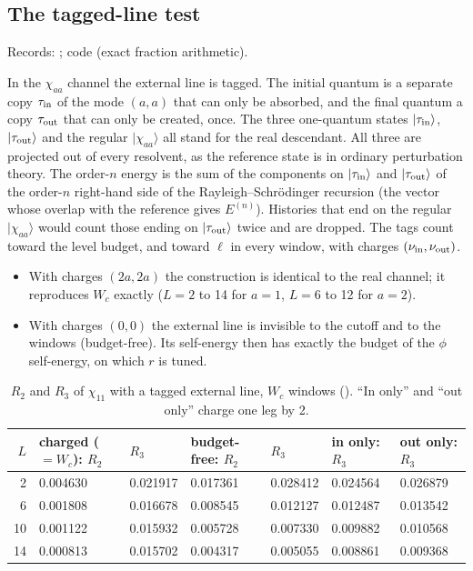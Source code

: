 \subsection{The tagged-line test}\label{d2:app:tag}
{\small\raggedright\noindent Records: ; code
 (exact fraction arithmetic).\par}

In the $\chi_{aa}$ channel the external line is tagged. The initial quantum is a separate copy $\tau_{\rm in}$ of the mode
$(a,a)$ that can only be absorbed, and the final quantum a copy $\tau_{\rm out}$ that can only be created, once. The three
one-quantum states $|\tau_{\rm in}\rangle$, $|\tau_{\rm out}\rangle$ and the regular $|\chi_{aa}\rangle$ all stand for the real
descendant. All three are projected out of every resolvent, as the reference state is in ordinary perturbation theory. The
order-$n$ energy is the sum of the components on $|\tau_{\rm in}\rangle$ and $|\tau_{\rm out}\rangle$ of the order-$n$
right-hand side of the Rayleigh--Schr\"odinger recursion (the vector whose overlap with the reference gives $E^{(n)}$).
Histories that end on the regular $|\chi_{aa}\rangle$ would count those ending on $|\tau_{\rm out}\rangle$ twice and are dropped. The tags count toward the level
budget, and toward $\ell$ in every window, with charges $(\nu_{\rm in},\nu_{\rm out})$.
\begin{itemize}
\item With charges $(2a,2a)$ the construction is identical to the real channel; it reproduces $W_c$ exactly ($L=2$ to 14
 for $a=1$, $L=6$ to 12 for $a=2$).
\item With charges $(0,0)$ the external line is invisible to the cutoff and to the windows (budget-free). Its self-energy
 then has exactly the budget of the $\phi$ self-energy, on which $r$ is tuned.
\end{itemize}

\begin{table}[ht]
\centering\footnotesize\renewcommand{\arraystretch}{1.15}
\begin{tabular}{@{}rllllll@{}}
\toprule
$L$ & charged ($=W_c$): $R_2$ & $R_3$ & budget-free: $R_2$ & $R_3$ & in only: $R_3$ & out only: $R_3$ \\\midrule
2 & 0.004630 & 0.021917 & 0.017361 & 0.028412 & 0.024564 & 0.026879 \\
6 & 0.001808 & 0.016678 & 0.008545 & 0.012127 & 0.012487 & 0.013542 \\
10 & 0.001122 & 0.015932 & 0.005728 & 0.007330 & 0.009882 & 0.010568 \\
14 & 0.000813 & 0.015702 & 0.004317 & 0.005055 & 0.008861 & 0.009368 \\
\bottomrule
\end{tabular}
\caption{$R_2$ and $R_3$ of $\chi_{11}$ with a tagged external line, $W_c$ windows ().
``In only'' and ``out only'' charge one leg by 2.}
\label{d2:tab:tag}
\end{table}

